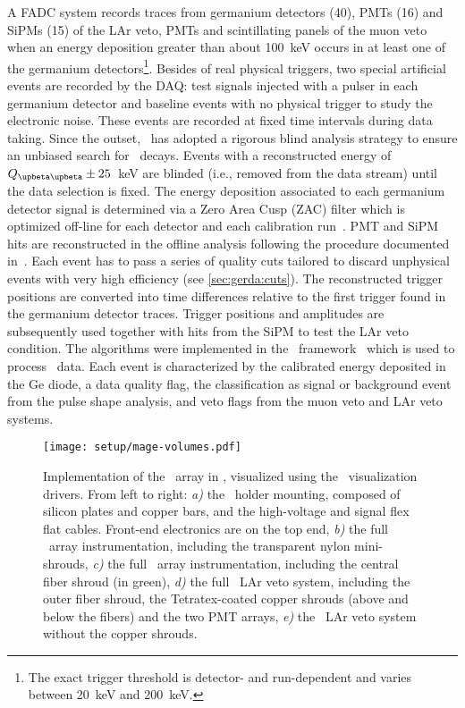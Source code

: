 A FADC system records traces from germanium detectors (40), PMTs (16) and SiPMs (15) of
the LAr veto, PMTs and scintillating panels of the muon veto when an energy deposition
greater than about 100~keV occurs in at least one of the germanium detectors\footnote{The
  exact trigger threshold is detector- and run-dependent and varies between 20~keV and
200~keV.}. Besides of real physical triggers, two special artificial events are recorded
by the DAQ: test signals injected with a pulser in each germanium detector and baseline
events with no physical trigger to study the electronic noise. These events are recorded
at fixed time intervals during data taking. Since the outset, \gerda\ has adopted a
rigorous blind analysis strategy to ensure an unbiased search for \onbb\ decays. Events with
a reconstructed energy of $\qbbM \pm 25$~keV are blinded (i.e., removed from
the data stream) until the data selection is fixed.
\newpar
The energy deposition associated to each germanium detector signal is
determined via a Zero Area Cusp (ZAC) filter which is optimized off-line for each detector
and each calibration run~\cite{Agostini2015}. PMT and SiPM hits are reconstructed in the
offline analysis following the procedure documented in~\cite{Agostini2018a}. Each event
has to pass a series of quality cuts tailored to discard unphysical events with very high
efficiency (see \cref{sec:gerda:cuts}). The reconstructed trigger positions are converted
into time differences relative to the first trigger found in the germanium detector
traces. Trigger positions and amplitudes are subsequently used together with hits from the
SiPM to test the LAr veto condition. The algorithms were implemented in the \gelatio\
framework~\cite{Agostini2011} which is used to process \gerda\ data. Each event is
characterized by the calibrated energy deposited in the Ge diode, a data quality flag, the
classification as signal or background event from the pulse shape analysis, and veto flags
from the muon veto and LAr veto systems.

\begin{figure}
  \centering
  \texttt{[image: setup/mage-volumes.pdf]}
  \caption{%
    Implementation of the \gerda\ array in \mage, visualized using the \geant\
    visualization drivers. From left to right: \emph{a)} the \phasetwo\ holder mounting,
    composed of silicon plates and copper bars, and the high-voltage and signal flex flat
    cables.  Front-end electronics are on the top end, \emph{b)} the full \phasetwo\ array
    instrumentation, including the transparent nylon mini-shrouds, \emph{c)} the full
    \phasetwop\ array instrumentation, including the central fiber shroud (in green),
    \emph{d)} the full \phasetwo\ LAr veto system, including the outer fiber shroud, the
    Tetratex\reg-coated copper shrouds (above and below the fibers) and the two PMT
    arrays, \emph{e)} the \phasetwop\ LAr veto system without the copper shrouds.
  }\label{fig:setup:magevolumes}
\end{figure}

